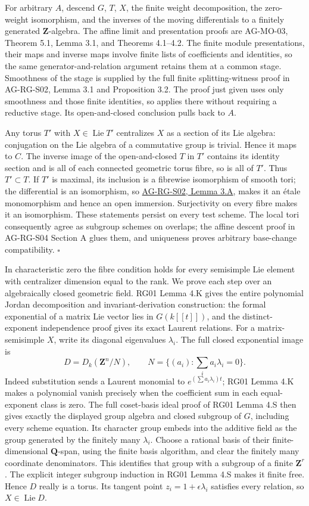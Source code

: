 \documentclass[11pt,a4paper,openany]{report}
\begin{document}
For arbitrary \(A\), descend \(G\), \(T\), \(X\), the finite weight decomposition, the zero-weight isomorphism, and the inverses of the moving differentials to a finitely generated \(\mathbf Z\)-algebra. The affine limit and presentation proofs are AG-MO-03, Theorem 5.1, Lemma 3.1, and Theorems 4.1--4.2. The finite module presentations, their maps and inverse maps involve finite lists of coefficients and identities, so the same generator-and-relation argument retains them at a common stage. Smoothness of the stage is supplied by the full finite splitting-witness proof in AG-RG-S02, Lemma 3.1 and Proposition 3.2. The proof just given uses only smoothness and those finite identities, so applies there without requiring a reductive stage. Its open-and-closed conclusion pulls back to \(A\).

Any torus \(T'\) with \(X\in\operatorname{Lie}T'\) centralizes \(X\) as a section of its Lie algebra: conjugation on the Lie algebra of a commutative group is trivial. Hence it maps to \(C\). The inverse image of the open-and-closed \(T\) in \(T'\) contains its identity section and is all of each connected geometric torus fibre, so is all of \(T'\). Thus \(T'\subset T\). If \(T'\) is maximal, its inclusion is a fibrewise isomorphism of smooth tori; the differential is an isomorphism, so \href{AG-RG-S02.html\#smooth-map-differential}{AG-RG-S02, Lemma 3.A}, makes it an étale monomorphism and hence an open immersion. Surjectivity on every fibre makes it an isomorphism. These statements persist on every test scheme. The local tori consequently agree as subgroup schemes on overlaps; the affine descent proof in AG-RG-S04 Section A glues them, and uniqueness proves arbitrary base-change compatibility. \(\square\)

In characteristic zero the fibre condition holds for every semisimple Lie element with centralizer dimension equal to the rank. We prove each step over an algebraically closed geometric field. RG01 Lemma 4.K gives the entire polynomial Jordan decomposition and invariant-derivation construction: the formal exponential of a matrix Lie vector lies in \(G(k[[t]])\), and the distinct-exponent independence proof gives its exact Laurent relations. For a matrix-semisimple \(X\), write its diagonal eigenvalues \(\lambda_i\). The full closed exponential image is \[
 D=D_k(\mathbf Z^n/N),\qquad N=\{(a_i):\textstyle\sum_i a_i\lambda_i=0\}.
\] Indeed substitution sends a Laurent monomial to \(e^{(\sum a_i\lambda_i)t}\); RG01 Lemma 4.K makes a polynomial vanish precisely when the coefficient sum in each equal-exponent class is zero. The full coset-basis ideal proof of RG01 Lemma 4.S then gives exactly the displayed group algebra and closed subgroup of \(G\), including every scheme equation. Its character group embeds into the additive field as the group generated by the finitely many \(\lambda_i\). Choose a rational basis of their finite-dimensional \(\mathbf Q\)-span, using the finite basis algorithm, and clear the finitely many coordinate denominators. This identifies that group with a subgroup of a finite \(\mathbf Z^r\). The explicit integer subgroup induction in RG01 Lemma 4.S makes it finite free. Hence \(D\) really is a torus. Its tangent point \(z_i=1+\epsilon\lambda_i\) satisfies every relation, so \(X\in\operatorname{Lie}D\).
\end{document}
